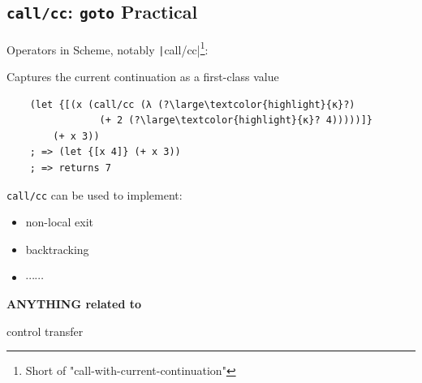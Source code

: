 \subsection{\texttt{call/cc}: \texttt{goto} Practical}
\begin{frame}[fragile]
	\frametitlesubs

	Operators in Scheme\cite{sussman1975scheme}, notably \texttt|call/cc|\cite{scheme1978revised}\footnote{Short of "call-with-current-continuation"}:

	Captures the current continuation as a first-class value

	\begin{verbatim}
    (let {[(x (call/cc (λ (?\large\textcolor{highlight}{κ}?)
                (+ 2 (?\large\textcolor{highlight}{κ}? 4)))))]}
        (+ x 3))
    ; => (let {[x 4]} (+ x 3))
    ; => returns 7
  \end{verbatim}

	\pause
	\texttt{call/cc} can be used to implement:

	\begin{minipage}{.3\textwidth}
		\begin{itemize}
			\item[\emoji{check-mark-button}] non-local exit
			\item[\emoji{check-mark-button}] backtracking
			\item[] $\cdots\cdots$
		\end{itemize}
	\end{minipage}
	\begin{minipage}{.64\textwidth}
		\pause
		{\Huge {}}
		\Large
		\parbox{.85\textwidth}{%
			\color{highlight}
			\bf
			\centering
			ANYTHING related to

			\boldslant control transfer%
		}
	\end{minipage}
\end{frame}

